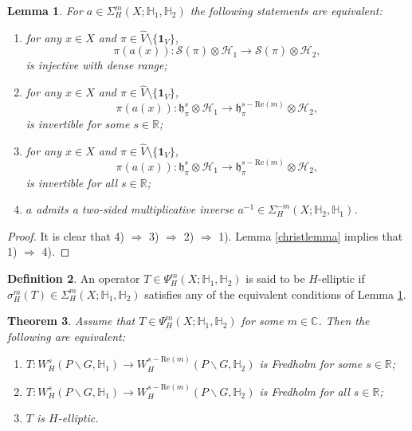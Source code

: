 \documentclass[a4paper,reqno]{amsart}
\numberwithin{equation}{section}
\def\C{\mathbb{C}}
\def\R{\mathbb{R}}
\newtheorem{thm}{Theorem}[section]
\newtheorem{lemma}[thm]{Lemma}
\theoremstyle{definition}
\newtheorem{definition}[thm]{Definition}
\theoremstyle{remark}
\begin{document}
\begin{lemma}
\label{alkdaldknad}
For $a\in \Sigma^m_H(X;\mathbb{H}_1,\mathbb{H}_2)$ the following statements are equivalent:
\begin{enumerate}
\item for any $x\in X$ and $\pi\in \hat{V}\setminus \{\pmb{1}_V\}$, 
$$\pi(a(x)):\mathcal{S}(\pi)\otimes \mathcal{H}_1\to \mathcal{S}(\pi)\otimes \mathcal{H}_2,$$ 
is injective with dense range;
\item for any $x\in X$ and $\pi\in \hat{V}\setminus \{\pmb{1}_V\}$, 
$$\pi(a(x)):\mathfrak{h}^s_\pi \otimes \mathcal{H}_1\to \mathfrak{h}^{s-\mathrm{Re}(m)}_\pi\otimes \mathcal{H}_2,$$ 
is invertible for some $s\in \R$;
\item for any $x\in X$ and $\pi\in \hat{V}\setminus \{\pmb{1}_V\}$, 
$$\pi(a(x)):\mathfrak{h}^s_\pi \otimes \mathcal{H}_1\to \mathfrak{h}^{s-\mathrm{Re}(m)}_\pi\otimes \mathcal{H}_2,$$ 
is invertible for all $s\in \R$;
\item $a$ admits a two-sided multiplicative inverse $a^{-1}\in \Sigma^{-m}_H(X;\mathbb{H}_2,\mathbb{H}_1)$.
\end{enumerate}
\end{lemma}


\begin{proof}
It is clear that 4) $\Rightarrow$ 3) $\Rightarrow$ 2) $\Rightarrow$ 1). Lemma \ref{christlemma} implies that 1) $\Rightarrow$ 4).
\end{proof}

\begin{definition}
An operator $T\in \Psi_H^m(X;\mathbb{H}_1,\mathbb{H}_2)$ is said to be $H$-elliptic if $\sigma_H^m(T)\in \Sigma^m_H(X;\mathbb{H}_1,\mathbb{H}_2)$ satisfies any of the equivalent conditions of Lemma \ref{alkdaldknad}.
\end{definition}

\begin{thm}
\label{adnajdn}
Assume that $T\in \Psi_H^m(X;\mathbb{H}_1,\mathbb{H}_2)$ for some $m\in \C$. Then the following are equivalent:
\begin{enumerate}
\item $T:W^s_H(P\backslash G,\mathbb{H}_1)\to W^{s-\mathrm{Re}(m)}_H(P\backslash G,\mathbb{H}_2)$ is Fredholm for some $s\in \R$;
\item $T:W^s_H(P\backslash G,\mathbb{H}_1)\to W^{s-\mathrm{Re}(m)}_H(P\backslash G,\mathbb{H}_2)$ is Fredholm for all $s\in \R$;
\item $T$ is $H$-elliptic.
\end{enumerate}
\end{thm}
\end{document}
